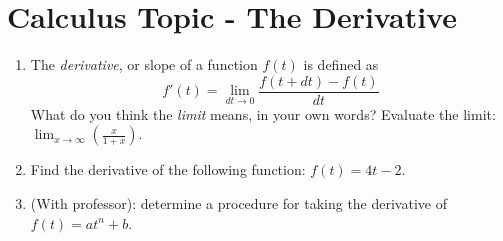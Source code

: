\documentclass{article}
\begin{document}
\section{Calculus Topic - The Derivative}

\begin{enumerate}
\item The \textit{derivative}, or slope of a function $f(t)$ is defined as 
\begin{equation}
f'(t) = \lim_{dt \to 0} \frac{f(t+dt) - f(t)}{dt}
\end{equation}
What do you think the \textit{limit} means, in your own words?  Evaluate the limit: $\lim_{x \to \infty} \left(\frac{x}{1+x}\right)$. \vspace{1cm}
\item Find the derivative of the following function: $f(t) = 4t - 2$. \vspace{1cm}
\item (With professor): determine a procedure for taking the derivative of $f(t) = a t^n + b$.
\end{enumerate}
\end{document}
